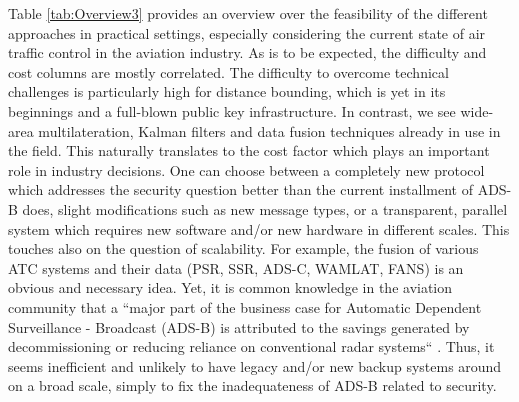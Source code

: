 \documentclass[english]{IEEEtran}
\begin{document}
Table \ref{tab:Overview3} provides an overview over the feasibility
of the different approaches in practical settings, especially considering
the current state of air traffic control in the aviation industry.
As is to be expected, the difficulty and cost columns are mostly correlated.
The difficulty to overcome technical challenges is particularly high
for distance bounding, which is yet in its beginnings and a full-blown
public key infrastructure. In contrast, we see wide-area multilateration,
Kalman filters and data fusion techniques already in use in the field.
This naturally translates to the cost factor which plays an important
role in industry decisions. One can choose between a completely new
protocol which addresses the security question better than the current
installment of ADS-B does, slight modifications such as new message
types, or a transparent, parallel system which requires new software
and/or new hardware in different scales. This touches also on the
question of scalability. For example, the fusion of various ATC systems
and their data (PSR, SSR, ADS-C, WAMLAT, FANS) is an obvious and necessary
idea. Yet, it is common knowledge in the aviation community that a
``major part of the business case for Automatic Dependent Surveillance
- Broadcast (ADS-B) is attributed to the savings generated by decommissioning
or reducing reliance on conventional radar systems`` \cite{Smith2006}.
Thus, it seems inefficient and unlikely to have legacy and/or new
backup systems around on a broad scale, simply to fix the inadequateness
of ADS-B related to security.
\end{document}

